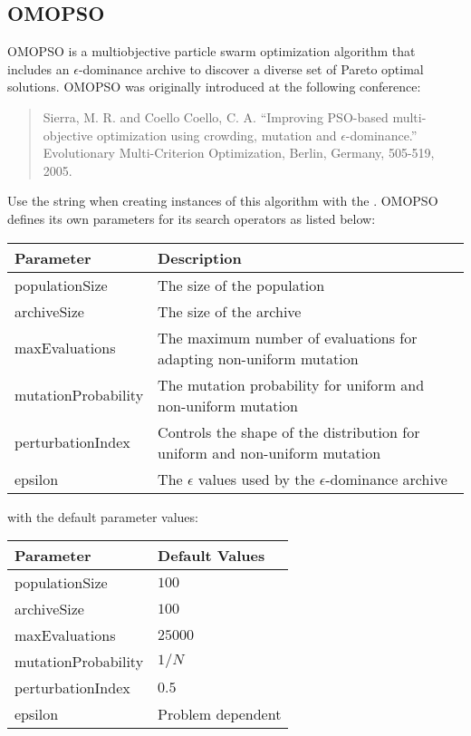 \subsection{OMOPSO}
OMOPSO is a multiobjective particle swarm optimization algorithm that includes an $\epsilon$-dominance archive to discover a diverse set of Pareto optimal solutions.  OMOPSO was originally introduced at the following conference:
\begin{quote}
Sierra, M. R. and Coello Coello, C. A.  ``Improving PSO-based multi-objective optimization using crowding, mutation and $\epsilon$-dominance.'' Evolutionary Multi-Criterion Optimization, Berlin, Germany, 505-519, 2005.
\end{quote}
Use the string  when creating instances of this algorithm with the .  OMOPSO defines its own parameters for its search operators as listed below:
\newline
\newline
\begin{tabularx}{\linewidth}{lX}
  \hline
  Parameter & Description \\
  \hline
  populationSize & The size of the population \\
  archiveSize & The size of the archive \\
  maxEvaluations & The maximum number of evaluations for adapting non-uniform mutation \\
  mutationProbability & The mutation probability for uniform and non-uniform mutation \\
  perturbationIndex & Controls the shape of the distribution for uniform and non-uniform mutation \\
  epsilon & The $\epsilon$ values used by the $\epsilon$-dominance archive \\
  \hline
\end{tabularx}
\newline
\newline
with the default parameter values:
\newline
\newline
\begin{tabularx}{\linewidth}{lX}
  \hline
  Parameter & Default Values \\
  \hline
  populationSize & $100$ \\
  archiveSize & $100$ \\
  maxEvaluations & $25000$ \\
  mutationProbability & $1/N$ \\
  perturbationIndex & $0.5$ \\
  epsilon & Problem dependent \\
  \hline
\end{tabularx}

